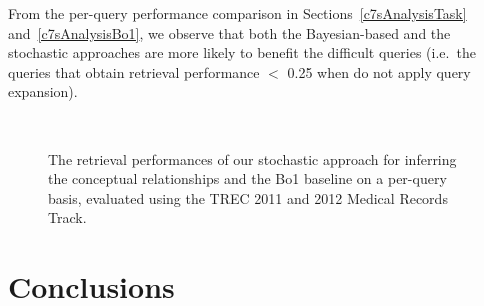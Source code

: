 \documentclass[1p]{elsarticle}
\begin{document}

From the per-query performance comparison in Sections~\ref{c7sAnalysisTask} and~\ref{c7sAnalysisBo1}, we observe that both the Bayesian-based and the stochastic approaches are more likely to benefit the difficult queries (i.e.\ the queries that obtain retrieval performance $<$ 0.25 when do not apply query expansion).

\begin{figure}[tb]
\centering
        \\%
    \caption{%
        The retrieval performances of our stochastic approach for inferring the conceptual relationships and the Bo1 baseline on a per-query basis, evaluated using the TREC 2011 and 2012 Medical Records Track.
     }%
   \label{fig:ch7:salsa-bo1}
\end{figure}


\section{Conclusions}\label{Conclusions}
\end{document}
